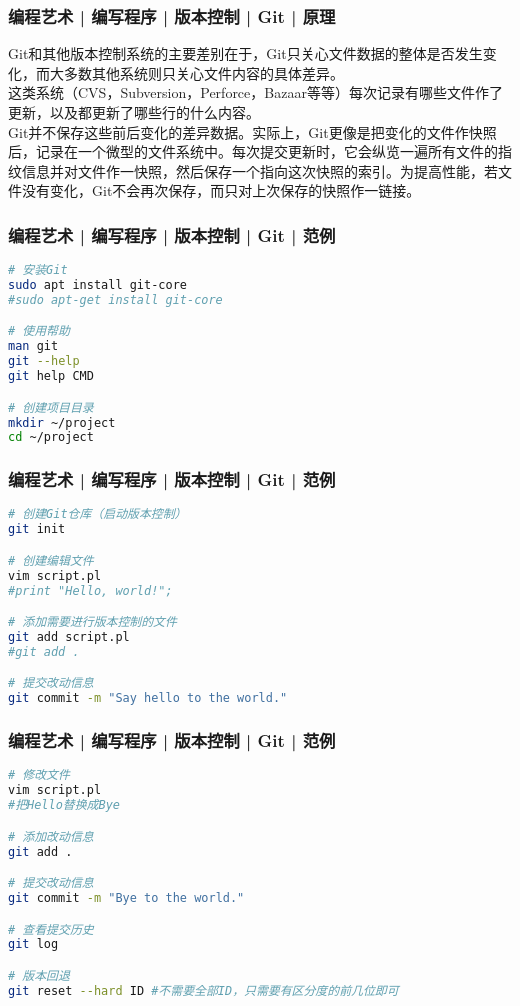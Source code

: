 \begin{frame}
  \frametitle{编程艺术 | 编写程序 | 版本控制 | Git | 原理}
Git和其他版本控制系统的主要差别在于，Git只关心文件数据的整体是否发生变化，而大多数其他系统则只关心文件内容的具体差异。\\
  \vspace{1em}
  这类系统（CVS，Subversion，Perforce，Bazaar等等）每次记录有哪些文件作了更新，以及都更新了哪些行的什么内容。\\
  \vspace{1em}
  Git并不保存这些前后变化的差异数据。实际上，Git更像是把变化的文件作快照后，记录在一个微型的文件系统中。每次提交更新时，它会纵览一遍所有文件的指纹信息并对文件作一快照，然后保存一个指向这次快照的索引。为提高性能，若文件没有变化，Git不会再次保存，而只对上次保存的快照作一链接。
\end{frame}

\begin{frame}[fragile]
  \frametitle{编程艺术 | 编写程序 | 版本控制 | Git | \alert{范例}}
\begin{lstlisting}[language=sh]
# 安装Git
sudo apt install git-core
#sudo apt-get install git-core

# 使用帮助
man git
git --help
git help CMD

# 创建项目目录
mkdir ~/project
cd ~/project
\end{lstlisting}
\end{frame}

\begin{frame}[fragile]
  \frametitle{编程艺术 | 编写程序 | 版本控制 | Git | \alert{范例}}
  \vspace{-1.5em}
\begin{lstlisting}[language=sh]
# 创建Git仓库（启动版本控制）
git init

# 创建编辑文件
vim script.pl
#print "Hello, world!";

# 添加需要进行版本控制的文件
git add script.pl
#git add .

# 提交改动信息
git commit -m "Say hello to the world."
\end{lstlisting}
\end{frame}

\begin{frame}[fragile]
  \frametitle{编程艺术 | 编写程序 | 版本控制 | Git | 范例}
  \vspace{-1.5em}
\begin{lstlisting}[language=sh]
# 修改文件
vim script.pl
#把Hello替换成Bye

# 添加改动信息
git add .

# 提交改动信息
git commit -m "Bye to the world."

# 查看提交历史
git log

# 版本回退
git reset --hard ID #不需要全部ID，只需要有区分度的前几位即可
\end{lstlisting}
\end{frame}


